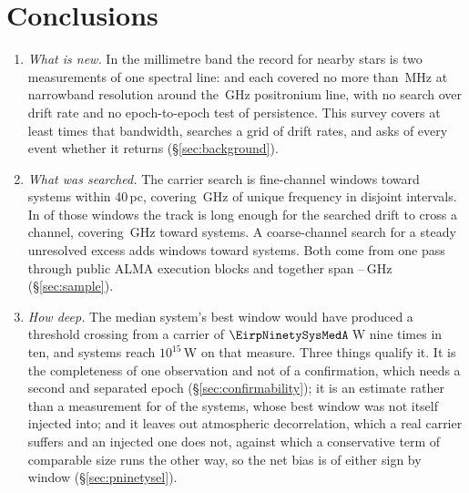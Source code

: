 \section{Conclusions}
\label{sec:conclusions}

\begin{enumerate}[leftmargin=1.6em,itemsep=4pt,topsep=4pt,parsep=0pt]

\item \emph{What is new.} In the millimetre band the record for nearby stars
is two measurements of one spectral line: \citet{Steffes1994} and
\citet{Mauersberger1996} each covered no more than \SbPriorBandMHz\,MHz at
narrowband resolution around the \SbPriorFreqGHz\,GHz positronium line, with
no search over drift rate and
no epoch-to-epoch test of persistence. This survey covers at
least \SbPriorRatio{} times that bandwidth, searches a grid of drift rates,
and asks of every event whether it returns (\S\ref{sec:background}).

\item \emph{What was searched.} The carrier search is \NWinA{} fine-channel
windows toward \NSysClassA{} systems within 40\,pc, covering \CvUnionA\,GHz
of unique frequency in \CovNIslands{} disjoint intervals. In \EdrNWinA{} of
those windows the track is long enough for the searched drift to cross a
channel, covering \EdrUnionGHz\,GHz toward \EdrNSys{} systems. A coarse-channel
search for a steady unresolved excess adds \NWinB{} windows toward
\PrSysClassB{} systems. Both come from one pass through \NEB{} public ALMA
execution blocks and together span \SurvFreqLo--\SurvFreqHi\,GHz
(\S\ref{sec:sample}).

\item \emph{How deep.} The median system's best window would have produced a
threshold crossing from a carrier of $\EirpNinetySysMedA$\,W nine times in
ten, and \NSysEfifteen{} systems reach $10^{15}$\,W on that measure. Three
things qualify it. It is the completeness of one observation and not of a
confirmation, which needs a second and separated epoch
(\S\ref{sec:confirmability}); it is an estimate rather than a measurement
for \SmcNEstSys{} of the \NSysClassA{} systems, whose best window was not
itself injected into; and it leaves out atmospheric decorrelation, which a
real carrier suffers and an injected one does not, against which a
conservative term of comparable size runs the other way, so the net bias is
of either sign by window (\S\ref{sec:pninetysel}).


\end{enumerate}
